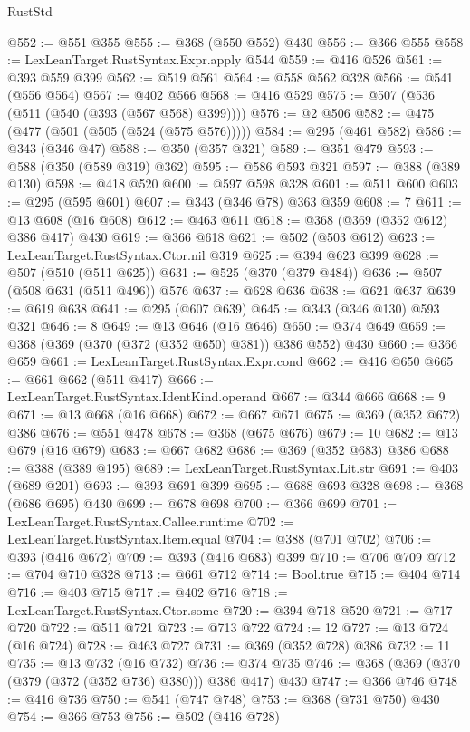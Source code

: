\begin{lexlean}{RustStd}
\begin{coremodule}
{\begin{coremodule}
{{{{{{{{{{@552 := @551 @355
@555 := @368 (@550 @552) @430
@556 := @366 @555
@558 := LexLeanTarget.RustSyntax.Expr.apply @544
@559 := @416 @526
@561 := @393 @559 @399
@562 := @519 @561
@564 := @558 @562 @328
@566 := @541 (@556 @564)
@567 := @402 @566
@568 := @416 @529
@575 := @507 (@536 (@511 (@540 (@393 (@567 @568) @399))))
@576 := @2 @506
@582 := @475 (@477 (@501 (@505 (@524 (@575 @576)))))
@584 := @295 (@461 @582)
@586 := @343 (@346 @47)
@588 := @350 (@357 @321)
@589 := @351 @479
@593 := @588 (@350 (@589 @319) @362)
@595 := @586 @593 @321
@597 := @388 (@389 @130)
@598 := @418 @520
@600 := @597 @598 @328
@601 := @511 @600
@603 := @295 (@595 @601)
@607 := @343 (@346 @78) @363 @359
@608 := 7
@611 := @13 @608 (@16 @608)
@612 := @463 @611
@618 := @368 (@369 (@352 @612) @386 @417) @430
@619 := @366 @618
@621 := @502 (@503 @612)
@623 := LexLeanTarget.RustSyntax.Ctor.nil @319
@625 := @394 @623 @399
@628 := @507 (@510 (@511 @625))
@631 := @525 (@370 (@379 @484))
@636 := @507 (@508 @631 (@511 @496)) @576
@637 := @628 @636
@638 := @621 @637
@639 := @619 @638
@641 := @295 (@607 @639)
@645 := @343 (@346 @130) @593 @321
@646 := 8
@649 := @13 @646 (@16 @646)
@650 := @374 @649
@659 := @368 (@369 (@370 (@372 (@352 @650) @381)) @386 @552) @430
@660 := @366 @659
@661 := LexLeanTarget.RustSyntax.Expr.cond
@662 := @416 @650
@665 := @661 @662 (@511 @417)
@666 := LexLeanTarget.RustSyntax.IdentKind.operand
@667 := @344 @666
@668 := 9
@671 := @13 @668 (@16 @668)
@672 := @667 @671
@675 := @369 (@352 @672) @386
@676 := @551 @478
@678 := @368 (@675 @676)
@679 := 10
@682 := @13 @679 (@16 @679)
@683 := @667 @682
@686 := @369 (@352 @683) @386
@688 := @388 (@389 @195)
@689 := LexLeanTarget.RustSyntax.Lit.str
@691 := @403 (@689 @201)
@693 := @393 @691 @399
@695 := @688 @693 @328
@698 := @368 (@686 @695) @430
@699 := @678 @698
@700 := @366 @699
@701 := LexLeanTarget.RustSyntax.Callee.runtime
@702 := LexLeanTarget.RustSyntax.Item.equal
@704 := @388 (@701 @702)
@706 := @393 (@416 @672)
@709 := @393 (@416 @683) @399
@710 := @706 @709
@712 := @704 @710 @328
@713 := @661 @712
@714 := Bool.true
@715 := @404 @714
@716 := @403 @715
@717 := @402 @716
@718 := LexLeanTarget.RustSyntax.Ctor.some
@720 := @394 @718 @520
@721 := @717 @720
@722 := @511 @721
@723 := @713 @722
@724 := 12
@727 := @13 @724 (@16 @724)
@728 := @463 @727
@731 := @369 (@352 @728) @386
@732 := 11
@735 := @13 @732 (@16 @732)
@736 := @374 @735
@746 := @368 (@369 (@370 (@379 (@372 (@352 @736) @380))) @386 @417) @430
@747 := @366 @746
@748 := @416 @736
@750 := @541 (@747 @748)
@753 := @368 (@731 @750) @430
@754 := @366 @753
@756 := @502 (@416 @728)
}}}}}}}}}}
\end{coremodule}}
\end{coremodule}
\end{lexlean}
